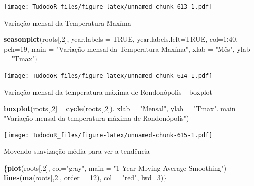 \documentclass[
]{book}
\newenvironment{Shaded}{\begin{snugshade}}{\end{snugshade}}
\newcommand{\DataTypeTok}[1]{\textcolor[rgb]{0.13,0.29,0.53}{#1}}
\newcommand{\DecValTok}[1]{\textcolor[rgb]{0.00,0.00,0.81}{#1}}
\newcommand{\KeywordTok}[1]{\textcolor[rgb]{0.13,0.29,0.53}{\textbf{#1}}}
\newcommand{\NormalTok}[1]{#1}
\newcommand{\OperatorTok}[1]{\textcolor[rgb]{0.81,0.36,0.00}{\textbf{#1}}}
\newcommand{\OtherTok}[1]{\textcolor[rgb]{0.56,0.35,0.01}{#1}}
\newcommand{\StringTok}[1]{\textcolor[rgb]{0.31,0.60,0.02}{#1}}
\begin{document}
\texttt{[image: TudodoR\_files/figure-latex/unnamed-chunk-613-1.pdf]}

Variação mensal da Temperatura Maxíma

\begin{Shaded}
\begin{Highlighting}[]
\KeywordTok{seasonplot}\NormalTok{(roots[,}\DecValTok{2}\NormalTok{], }\DataTypeTok{year.labels =} \OtherTok{TRUE}\NormalTok{, }\DataTypeTok{year.labels.left=}\OtherTok{TRUE}\NormalTok{, }\DataTypeTok{col=}\DecValTok{1}\OperatorTok{:}\DecValTok{40}\NormalTok{, }\DataTypeTok{pch=}\DecValTok{19}\NormalTok{, }\DataTypeTok{main =} \StringTok{"Variação mensal da Temperatura Maxíma"}\NormalTok{, }\DataTypeTok{xlab =} \StringTok{"Mês", ylab = "}\NormalTok{Tmax}\StringTok{")}
\end{Highlighting}
\end{Shaded}

\texttt{[image: TudodoR\_files/figure-latex/unnamed-chunk-614-1.pdf]}

Variação mensal da temperatura máxima de Rondonópolis -- boxplot

\begin{Shaded}
\begin{Highlighting}[]
\KeywordTok{boxplot}\NormalTok{(roots[,}\DecValTok{2}\NormalTok{] }\OperatorTok{~}\StringTok{ }\KeywordTok{cycle}\NormalTok{(roots[,}\DecValTok{2}\NormalTok{]), }\DataTypeTok{xlab =} \StringTok{"Mensal"}\NormalTok{, }\DataTypeTok{ylab =} \StringTok{"Tmax"}\NormalTok{, }\DataTypeTok{main =} \StringTok{"Variação mensal da temperatura máxima de Rondonópolis")}
\end{Highlighting}
\end{Shaded}

\texttt{[image: TudodoR\_files/figure-latex/unnamed-chunk-615-1.pdf]}

Movendo suavização média para ver a tendência

\begin{Shaded}
\begin{Highlighting}[]
\NormalTok{\{}\KeywordTok{plot}\NormalTok{(roots[,}\DecValTok{2}\NormalTok{], }\DataTypeTok{col=}\StringTok{"gray"}\NormalTok{, }\DataTypeTok{main =} \StringTok{"1 Year Moving Average Smoothing"}\NormalTok{)}
\KeywordTok{lines}\NormalTok{(}\KeywordTok{ma}\NormalTok{(roots[,}\DecValTok{2}\NormalTok{], }\DataTypeTok{order =} \DecValTok{12}\NormalTok{), }\DataTypeTok{col =} \StringTok{"red"}\NormalTok{, }\DataTypeTok{lwd=}\DecValTok{3}\NormalTok{)\}}
\end{Highlighting}
\end{Shaded}
\end{document}
